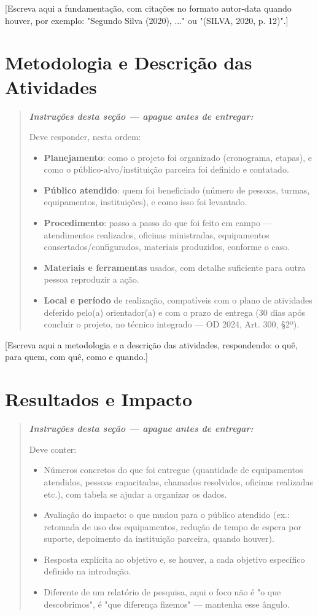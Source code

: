 \documentclass[article,12pt,a4paper,oneside]{abntex2}
\newenvironment{instrucoes}{%
  \begin{quotation}\footnotesize\itshape
  \noindent\textbf{\upshape Instruções desta seção — apague antes de entregar:}\par\smallskip
}{%
  \end{quotation}
}
\begin{document}
[Escreva aqui a fundamentação, com citações no formato autor-data quando houver, por
exemplo: "Segundo Silva (2020), ..." ou "(SILVA, 2020, p. 12)".]

\section{Metodologia e Descrição das Atividades}

\begin{instrucoes}
Deve responder, nesta ordem:
\begin{itemize}
  \item \textbf{Planejamento}: como o projeto foi organizado (cronograma, etapas), e como o público-alvo/instituição parceira foi definido e contatado.
  \item \textbf{Público atendido}: quem foi beneficiado (número de pessoas, turmas, equipamentos, instituições), e como isso foi levantado.
  \item \textbf{Procedimento}: passo a passo do que foi feito em campo — atendimentos realizados, oficinas ministradas, equipamentos consertados/configurados, materiais produzidos, conforme o caso.
  \item \textbf{Materiais e ferramentas} usados, com detalhe suficiente para outra pessoa reproduzir a ação.
  \item \textbf{Local e período} de realização, compatíveis com o plano de atividades deferido pelo(a) orientador(a) e com o prazo de entrega (30 dias após concluir o projeto, no técnico integrado — OD 2024, Art. 300, §2º).
\end{itemize}
\end{instrucoes}

[Escreva aqui a metodologia e a descrição das atividades, respondendo: o quê, para quem, com quê, como e quando.]

\section{Resultados e Impacto}

\begin{instrucoes}
Deve conter:
\begin{itemize}
  \item Números concretos do que foi entregue (quantidade de equipamentos atendidos, pessoas capacitadas, chamados resolvidos, oficinas realizadas etc.), com tabela se ajudar a organizar os dados.
  \item Avaliação do impacto: o que mudou para o público atendido (ex.: retomada de uso dos equipamentos, redução de tempo de espera por suporte, depoimento da instituição parceira, quando houver).
  \item Resposta explícita ao objetivo e, se houver, a cada objetivo específico definido na introdução.
  \item Diferente de um relatório de pesquisa, aqui o foco não é "o que descobrimos", é "que diferença fizemos" — mantenha esse ângulo.
\end{itemize}
\end{instrucoes}
\end{document}
